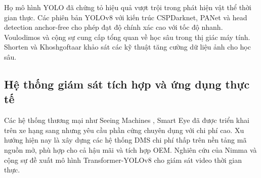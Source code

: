 Họ mô hình YOLO \cite{redmon2016} đã chứng tỏ hiệu quả vượt trội trong phát hiện vật thể thời gian thực. Các phiên bản YOLOv8 \cite{jocher2023} với kiến trúc CSPDarknet, PANet và head detection anchor-free cho phép đạt độ chính xác cao với tốc độ nhanh. Voulodimos và cộng sự \cite{voulodimos2018} cung cấp tổng quan về học sâu trong thị giác máy tính. Shorten và Khoshgoftaar \cite{shorten2019} khảo sát các kỹ thuật tăng cường dữ liệu ảnh cho học sâu.

\subsection{Hệ thống giám sát tích hợp và ứng dụng thực tế}

Các hệ thống thương mại như Seeing Machines \cite{seeingmachines2022}, Smart Eye đã được triển khai trên xe hạng sang nhưng yêu cầu phần cứng chuyên dụng với chi phí cao. Xu hướng hiện nay là xây dựng các hệ thống DMS chi phí thấp trên nền tảng mã nguồn mở, phù hợp cho cả hậu mãi và tích hợp OEM. Nghiên cứu của Nimma và cộng sự \cite{nimma2025} đề xuất mô hình Transformer-YOLOv8 cho giám sát video thời gian thực.
